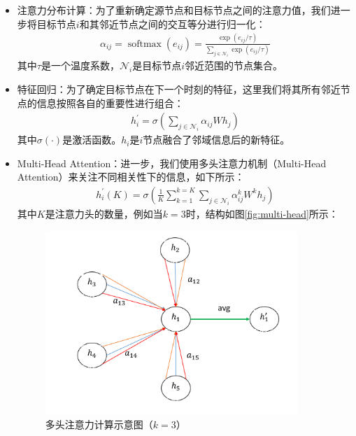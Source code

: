 \begin{itemize}
  \item 注意力分布计算：为了重新确定源节点和目标节点之间的注意力值，我们进一步将目标节点$i$和其邻近节点之间的交互等分进行归一化：
  \begin{align}
    \alpha_{i j}=\operatorname{softmax}\left(e_{i j}\right)=\frac{\exp \left(e_{i j} / \tau\right)}{\sum_{j \in \mathcal{N}_{i}} \exp \left(e_{i j} / \tau\right)}
  \end{align}
  其中$\tau$是一个温度系数，$\mathcal{N}_{i}$是目标节点$i$邻近范围的节点集合。
  \item 特征回归：为了确定目标节点在下一个时刻的特征，这里我们将其所有邻近节点的信息按照各自的重要性进行组合：
  \begin{align}
    h_{i}^{\prime}=\sigma\left(\sum_{j \in \mathcal{N}_{i}} \alpha_{i j} W h_{j}\right)
  \end{align}
  其中$\sigma(\cdot)$是激活函数。$h_{i}$是$i$节点融合了邻域信息后的新特征。
  \item Multi-Head Attention：进一步，我们使用多头注意力机制（Multi-Head Attention）来关注不同相关性下的信息，如下所示：
  \begin{align}
    h_{i}^{\prime}(K)=\sigma\left( \frac{1}{K} \sum_{k=1}^{k=K} \sum_{j \in \mathcal{N}_{i}} \alpha_{i j}^{k} W^{k} h_{j}\right)
  \end{align}
  其中$K$是注意力头的数量，例如当$k = 3$时，结构如图\autoref{fig:multi-head}所示：
  \begin{figure}[htb]
    \includegraphics[width=0.9\textwidth]{fig/multi-head.pdf}
    \caption{多头注意力计算示意图（$k=3$）}
    \label{fig:multi-head}
  \end{figure}
\end{itemize}

